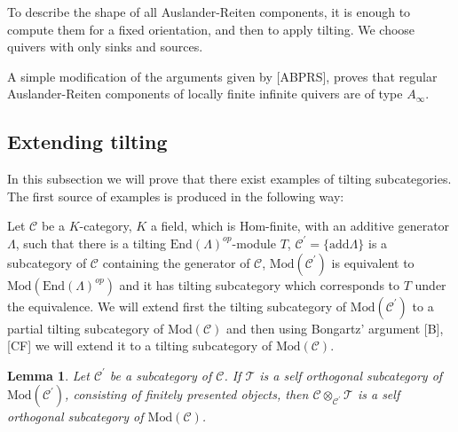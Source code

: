 \documentclass{amsart}
\theoremstyle{plain}
\newtheorem{lemma}{Lemma}
\numberwithin{equation}{section}
\begin{document}
To describe the shape of all Auslander-Reiten components, it is enough to
compute them for a fixed orientation, and then to apply tilting. We choose
quivers with only sinks and sources.

A simple modification of the arguments given by [ABPRS], proves that regular
Auslander-Reiten components of locally finite infinite quivers are of type $A_{\infty }$.

\subsection{Extending tilting}

In this subsection we will prove that there exist examples of tilting
subcategories. The first source of examples is produced in the following way:

Let $\mathcal{C}$ be a $K$-category, $K$ a field, which is $\mathrm{Hom}$-finite, with an additive generator $\varLambda$, such that there is a
tilting $\mathrm{End}(\varLambda)^{op}$-module $T$, $\mathcal{C}^{\prime }=\{\mathrm{add}\varLambda\}$ is a subcategory of $\mathcal{C}$ containing the
generator of $\mathcal{C}$, $\mathrm{\mathrm{Mod}}(\mathcal{C}^{\prime })$
is equivalent to $\mathrm{\mathrm{Mod}}(\mathrm{End}(\varLambda)^{op})$ and
it has tilting subcategory which corresponds to $T$ under the equivalence.
We will extend first the tilting subcategory of $\mathrm{\mathrm{Mod}}(\mathcal{C}^{\prime })$ to a partial tilting subcategory of $\mathrm{\mathrm{Mod}}(\mathcal{C})$ and then using Bongartz' argument [B], [CF] we will
extend it to a tilting subcategory of $\mathrm{\mathrm{Mod}}(\mathcal{C})$.

\begin{lemma}
\label{ET1} Let $\mathcal{C}^{\prime }$ be a subcategory of $\mathcal{C}$.
If $\mathcal{T}$ is a self orthogonal subcategory of $\mathrm{\mathrm{Mod}}(\mathcal{C}^{\prime })$, consisting of finitely presented objects, then $\mathcal{C}\otimes _{\mathcal{C}^{\prime }}\mathcal{T}$ is a self orthogonal
subcategory of $\mathrm{\mathrm{Mod}}(\mathcal{C})$.
\end{lemma}
\end{document}
